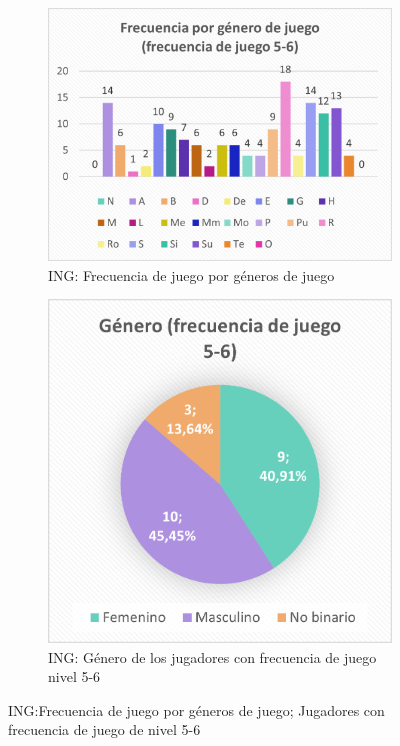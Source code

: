 \documentclass[12pt, a4paper,twoside,titlepage]{book}
\begin{document}
\begin{figure}
\centering
\begin{subfigure}{.6\textwidth}
  \centering
  \includegraphics[width=.95\linewidth]{ANEXO ING/5AnexINGFre56}
  \caption{ING: Frecuencia de juego por géneros de juego}
\end{subfigure}%
\begin{subfigure}{.4\textwidth}
  \centering
  \includegraphics[width=.95\linewidth]{ANEXO ING/6Anex56Gen}
  \caption{ING: Género de los jugadores con frecuencia de juego nivel 5-6}
\end{subfigure}
\caption{ING:Frecuencia de juego por géneros de juego; Jugadores con frecuencia de juego de nivel 5-6}
 \label{fig:INGFrecgen56}
\end{figure}
\end{document}
